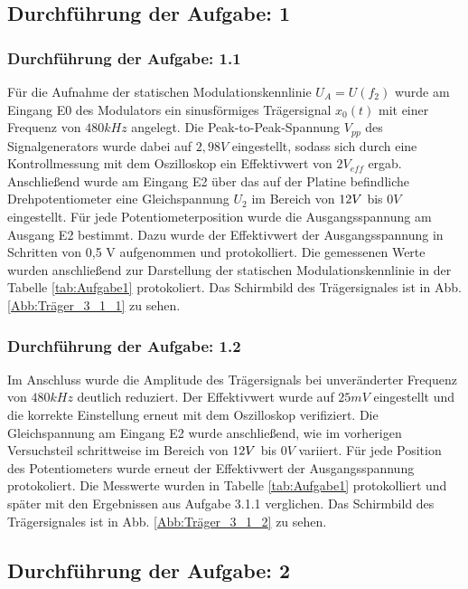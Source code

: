 \documentclass[12pt]{scrartcl}
\begin{document}
\subsection{Durchführung der Aufgabe:  1}
\subsubsection*{Durchführung der Aufgabe: 1.1}
Für die Aufnahme der statischen Modulationskennlinie $U_A = U(f_2)$ wurde am Eingang E0 des Modulators ein sinusförmiges Trägersignal $x_0(t)$ mit einer Frequenz von $480 kHz$ angelegt. 
Die Peak-to-Peak-Spannung $V_{pp}$ des Signalgenerators wurde dabei auf $2,98 V$ eingestellt, sodass sich durch eine Kontrollmessung mit dem Oszilloskop ein Effektivwert von $2 V_{eff}$ 
ergab. Anschließend wurde am Eingang E2 über das auf der Platine befindliche Drehpotentiometer eine Gleichspannung $U_2$ im Bereich von $\- 12 V$ bis $0 V$ eingestellt.
Für jede Potentiometerposition wurde die Ausgangsspannung am Ausgang E2 bestimmt. Dazu wurde der Effektivwert der Ausgangsspannung in Schritten von 0,5 V aufgenommen und protokolliert. 
Die gemessenen Werte wurden anschließend zur Darstellung der statischen Modulationskennlinie in der Tabelle \ref{tab:Aufgabe1} protokoliert. Das Schirmbild des Trägersignales ist in Abb. 
\ref{Abb:Träger_3_1_1} zu sehen. 





\subsubsection*{Durchführung der Aufgabe: 1.2}
Im Anschluss wurde die Amplitude des Trägersignals bei unveränderter Frequenz von $480 kHz$ deutlich reduziert. Der Effektivwert wurde auf $25 mV$ eingestellt und die korrekte Einstellung 
erneut mit dem Oszilloskop verifiziert.
Die Gleichspannung am Eingang E2 wurde anschließend, wie im vorherigen Versuchsteil schrittweise im Bereich von $\- 12 V$ bis $0 V$ variiert. Für jede Position des Potentiometers wurde 
erneut der Effektivwert der Ausgangsspannung protokoliert. Die Messwerte wurden in Tabelle  \ref{tab:Aufgabe1} protokolliert und später mit den Ergebnissen aus Aufgabe 3.1.1 verglichen. Das Schirmbild 
des Trägersignales ist in Abb. \ref{Abb:Träger_3_1_2} zu sehen. 



\newpage

\subsection{Durchführung der Aufgabe: 2}
\end{document}
